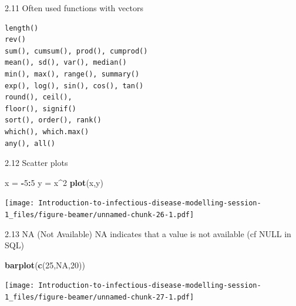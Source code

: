 \documentclass[
  ignorenonframetext,
]{beamer}
\newenvironment{Shaded}{\begin{snugshade}}{\end{snugshade}}
\newcommand{\ConstantTok}[1]{\textcolor[rgb]{0.56,0.35,0.01}{#1}}
\newcommand{\DecValTok}[1]{\textcolor[rgb]{0.00,0.00,0.81}{#1}}
\newcommand{\FunctionTok}[1]{\textcolor[rgb]{0.13,0.29,0.53}{\textbf{#1}}}
\newcommand{\NormalTok}[1]{#1}
\newcommand{\OtherTok}[1]{\textcolor[rgb]{0.56,0.35,0.01}{#1}}
\newcommand{\SpecialCharTok}[1]{\textcolor[rgb]{0.81,0.36,0.00}{\textbf{#1}}}
\begin{document}
\begin{frame}[fragile]{2.11 Often used functions with vectors}
\protect\hypertarget{often-used-functions-with-vectors}{}
\begin{verbatim}
length()
rev()
sum(), cumsum(), prod(), cumprod()
mean(), sd(), var(), median()
min(), max(), range(), summary()
exp(), log(), sin(), cos(), tan()
round(), ceil(), 
floor(), signif()
sort(), order(), rank()
which(), which.max()
any(), all()
\end{verbatim}
\end{frame}

\begin{frame}[fragile]{2.12 Scatter plots}
\protect\hypertarget{scatter-plots}{}
\begin{Shaded}
\begin{Highlighting}[]
\NormalTok{x }\OtherTok{=} \SpecialCharTok{{-}}\DecValTok{5}\SpecialCharTok{:}\DecValTok{5}
\NormalTok{y }\OtherTok{=}\NormalTok{ x}\SpecialCharTok{\^{}}\DecValTok{2}
\FunctionTok{plot}\NormalTok{(x,y)}
\end{Highlighting}
\end{Shaded}

\texttt{[image: Introduction-to-infectious-disease-modelling-session-1\_files/figure-beamer/unnamed-chunk-26-1.pdf]}
\end{frame}

\begin{frame}[fragile]{2.13 NA (Not Available)}
\protect\hypertarget{na-not-available}{}
NA indicates that a value is not available (cf NULL in SQL)

\begin{Shaded}
\begin{Highlighting}[]
\FunctionTok{barplot}\NormalTok{(}\FunctionTok{c}\NormalTok{(}\DecValTok{25}\NormalTok{,}\ConstantTok{NA}\NormalTok{,}\DecValTok{20}\NormalTok{))}
\end{Highlighting}
\end{Shaded}

\texttt{[image: Introduction-to-infectious-disease-modelling-session-1\_files/figure-beamer/unnamed-chunk-27-1.pdf]}
\end{frame}
\end{document}
